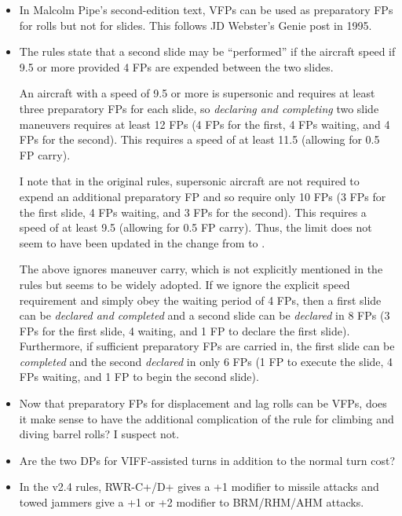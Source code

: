 \documentclass[10pt]{article}
\begin{document}
\begin{itemize}
\item In Malcolm Pipe's second-edition text, VFPs can be used as preparatory FPs for rolls but not for slides. This follows JD Webster's Genie post in 1995.

\item The rules state that a second slide may be “performed” if the aircraft speed if 9.5 or more provided 4 FPs are expended between the two slides. 

An aircraft with a speed of 9.5 or more is supersonic and requires at least three preparatory FPs for each slide, so \emph{declaring and completing} two slide maneuvers requires at least 12 FPs (4 FPs for the first, 4 FPs waiting, and 4 FPs for the second). This requires a speed of at least 11.5 (allowing for 0.5 FP carry). 

I note that in the original {\AirSup} rules, supersonic aircraft are not required to expend an additional preparatory FP and so require only 10 FPs (3 FPs for the first slide, 4 FPs waiting, and 3 FPs for the second). This requires a speed of at least 9.5 (allowing for 0.5 FP carry). Thus, the limit does not seem to have been updated in the change from {\AirSup} to {\AirPow}.

The above ignores maneuver carry, which is not explicitly mentioned in the rules but seems to be widely adopted. If we ignore the explicit speed requirement and simply obey the waiting period of 4 FPs, then a first slide can be \emph{declared and completed} and a second slide can be \emph{declared} in 8 FPs (3 FPs for the first slide, 4 waiting, and 1 FP to declare the first slide). Furthermore, if sufficient preparatory FPs are carried in, the first slide can be \emph{completed} and the second \emph{declared} in only 6 FPs (1 FP to execute the slide, 4 FPs waiting, and 1 FP to begin the second slide).

\item Now that preparatory FPs for displacement and lag rolls can be VFPs, does it make sense to have the additional complication of the rule for climbing and diving barrel rolls? I suspect not.

\item Are the two DPs for VIFF-assisted turns in addition to the normal turn cost?

\item In the v2.4 rules, RWR-C+/D+ gives a +1 modifier to missile attacks and towed jammers give a +1 or +2 modifier to BRM/RHM/AHM attacks.

\end{itemize}
\end{document}

